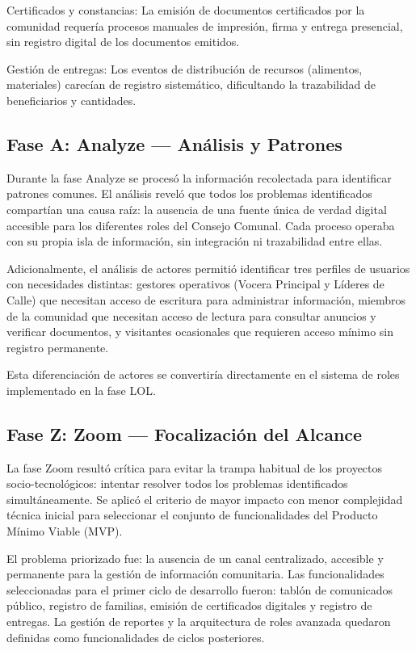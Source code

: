 \documentclass[14pt,a4paper,oneside]{extbook}
\begin{document}
Certificados y constancias: La emisión de documentos certificados por la comunidad requería procesos manuales de impresión, firma y entrega presencial, sin registro digital de los documentos emitidos.

Gestión de entregas: Los eventos de distribución de recursos (alimentos, materiales) carecían de registro sistemático, dificultando la trazabilidad de beneficiarios y cantidades.



\subsection{Fase A: Analyze — Análisis y Patrones}

Durante la fase Analyze se procesó la información recolectada para identificar patrones comunes. El análisis reveló que todos los problemas identificados compartían una causa raíz: la ausencia de una fuente única de verdad digital accesible para los diferentes roles del Consejo Comunal. Cada proceso operaba con su propia isla de información, sin integración ni trazabilidad entre ellas.

Adicionalmente, el análisis de actores permitió identificar tres perfiles de usuarios con necesidades distintas: gestores operativos (Vocera Principal y Líderes de Calle) que necesitan acceso de escritura para administrar información, miembros de la comunidad que necesitan acceso de lectura para consultar anuncios y verificar documentos, y visitantes ocasionales que requieren acceso mínimo sin registro permanente.

Esta diferenciación de actores se convertiría directamente en el sistema de roles implementado en la fase LOL.



\subsection{Fase Z: Zoom — Focalización del Alcance}

La fase Zoom resultó crítica para evitar la trampa habitual de los proyectos socio-tecnológicos: intentar resolver todos los problemas identificados simultáneamente. Se aplicó el criterio de mayor impacto con menor complejidad técnica inicial para seleccionar el conjunto de funcionalidades del Producto Mínimo Viable (MVP).

El problema priorizado fue: la ausencia de un canal centralizado, accesible y permanente para la gestión de información comunitaria. Las funcionalidades seleccionadas para el primer ciclo de desarrollo fueron: tablón de comunicados público, registro de familias, emisión de certificados digitales y registro de entregas. La gestión de reportes y la arquitectura de roles avanzada quedaron definidas como funcionalidades de ciclos posteriores.
\end{document}
